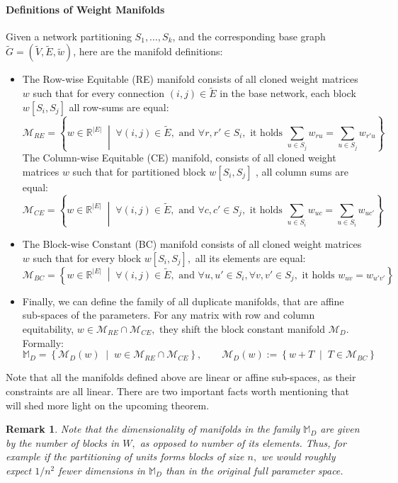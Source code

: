 \documentclass{article}
\newcommand{\R}{\mathbb{R}}
\newcommand{\BaseW}{\widetilde{w}}
\newcommand{\BaseG}{\widetilde{G}}
\newcommand{\BaseV}{\widetilde{V}}
\newcommand{\BaseE}{\widetilde{E}}
\newcommand{\ManifoldD}{\mathcal{M}_{D}}
\newcommand{\ManifoldRE}{\mathcal{M}_{RE}}
\newcommand{\ManifoldCE}{\mathcal{M}_{CE}}
\newcommand{\ManifoldBC}{\mathcal{M}_{BC}}
\newtheorem{remark}{Remark}[section]
\numberwithin{figure}{section}
\begin{document}
\paragraph{Definitions of Weight Manifolds}
Given a network partitioning $S_1,\dots , S_k$, and the corresponding base graph $\BaseG = (\BaseV, \BaseE, \BaseW)$, here are the manifold definitions:
\begin{itemize}
    \item  The Row-wise Equitable (RE) manifold consists of all cloned weight matrices $w$ such that for every connection $(i,j) \in \BaseE$ in the base network, each block $w[S_i, S_j]$ all row-sums are equal:
    $$
\ManifoldRE = \left\{ w\in \R^{|E|} \;\middle|\; \forall (i,j) \in \BaseE, \text{ and } \forall r,r' \in S_i, \text{ it holds } \sum_{u \in S_j} w_{r u} = \sum_{u \in S_j} w_{r' u}
\right\}
$$
The Column-wise Equitable (CE) manifold, consists of all cloned weight matrices $w$ such that for partitioned block $w[S_i, S_j]$ , all column sums are equal:
$$
\ManifoldCE = \left\{ w\in \R^{|E|} \;\middle|\; \forall (i,j) \in \BaseE, \text{ and } \forall c,c' \in S_j, \text{ it holds } \sum_{u \in S_i}  w_{u c} = \sum_{u \in S_i}  w_{u c'} \right\}
$$
\item The Block-wise Constant (BC) manifold consists of all cloned weight matrices $w$ such that for every block $w[S_i, S_j],$ all its elements are equal:
$$
\ManifoldBC = \left\{ w\in \R^{|E|} \;\middle|\; \forall (i,j) \in \BaseE, \text{ and } \forall u,u' \in S_i, \forall v,v' \in S_j, \text{ it holds }  w_{uv} = w_{u'v'} \right\}
$$
\item Finally, we can define the family of all duplicate manifolds, that are affine sub-spaces of the parameters. For any matrix with row and column equitability, $w\in \ManifoldRE\cap\ManifoldCE,$ they shift the block constant manifold $\ManifoldD.$ Formally:
$$
\mathbb{M}_D = \left\{ \ManifoldD(w) \;\middle|\; w\in \ManifoldRE\cap\ManifoldCE \right\}, \qquad \ManifoldD(w):= \left\{w+T\;\middle|\; T\in \ManifoldBC \right\}
$$
\end{itemize}
Note that all the manifolds defined above are linear or affine sub-spaces, as their constraints are all linear. 
There are two important facts worth mentioning that will shed more light on the upcoming theorem. 
\begin{remark}
Note that the dimensionality of manifolds in the family $\mathbb{M}_D$ are given by the number of blocks in $W,$ as opposed to number of its elements. Thus, for example if the partitioning of units forms blocks of size $n,$ we would roughly expect $1/n^2$ fewer dimensions in $\mathbb{M}_D$ than in the original full parameter space. 
\end{remark}
\end{document}
